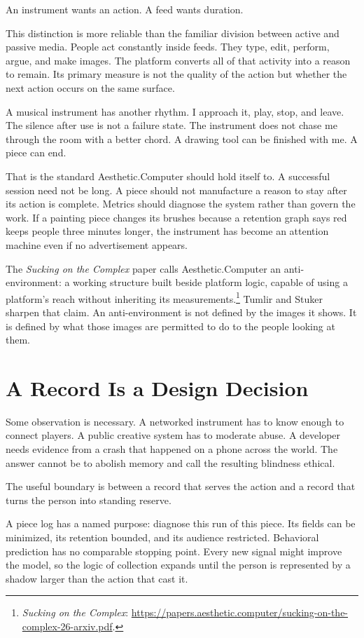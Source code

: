 \documentclass[11pt,letterpaper]{article}
\newcommand{\ac}{Aesthetic\textcolor{acpink}{.}Computer}
\begin{document}
An instrument wants an action. A feed wants duration.

This distinction is more reliable than the familiar division between active and
passive media. People act constantly inside feeds. They type, edit, perform,
argue, and make images. The platform converts all of that activity into a reason
to remain. Its primary measure is not the quality of the action but whether the
next action occurs on the same surface.

A musical instrument has another rhythm. I approach it, play, stop, and leave.
The silence after use is not a failure state. The instrument does not chase me
through the room with a better chord. A drawing tool can be finished with me. A
piece can end.

That is the standard \ac{} should hold itself to. A successful session need not
be long. A piece should not manufacture a reason to stay after its action is
complete. Metrics should diagnose the system rather than govern the work. If a
painting piece changes its brushes because a retention graph says red keeps
people three minutes longer, the instrument has become an attention machine even
if no advertisement appears.

The \textit{Sucking on the Complex} paper calls \ac{} an anti-environment: a
working structure built beside platform logic, capable of using a platform's
reach without inheriting its measurements.\footnote{\textit{Sucking on the
Complex}: \url{https://papers.aesthetic.computer/sucking-on-the-complex-26-arxiv.pdf}.}
Tumlir and Stuker sharpen that claim. An anti-environment is not defined by the
images it shows. It is defined by what those images are permitted to do to the
people looking at them.

\section{A Record Is a Design Decision}

Some observation is necessary. A networked instrument has to know enough to
connect players. A public creative system has to moderate abuse. A developer
needs evidence from a crash that happened on a phone across the world. The
answer cannot be to abolish memory and call the resulting blindness ethical.

The useful boundary is between a record that serves the action and a record that
turns the person into standing reserve.

A piece log has a named purpose: diagnose this run of this piece. Its fields can
be minimized, its retention bounded, and its audience restricted. Behavioral
prediction has no comparable stopping point. Every new signal might improve the
model, so the logic of collection expands until the person is represented by a
shadow larger than the action that cast it.
\end{document}
